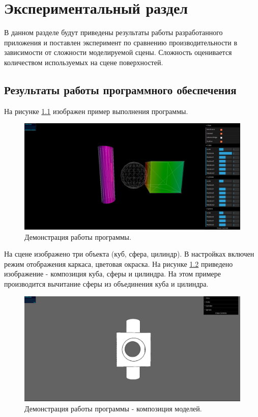 \chapter{Экспериментальный раздел}
\label{cha:research}

В данном разделе будут приведены результаты работы разработанного
приложения и поставлен эксперимент по сравнению производительности
в зависимости от сложности моделируемой сцены. Сложность оценивается количеством используемых на сцене поверхностей.

\section{Результаты работы программного обеспечения}
На рисунке \ref{fig:example_run} изображен пример выполнения программы. 
\begin{figure}
  \centering
  \includegraphics[scale=0.4]{inc/img/example_run}
  \caption{Демонстрация работы программы.}
  \label{fig:example_run}
\end{figure}

На сцене изображено три объекта (куб, сфера, цилиндр).
В настройках включен режим отображения каркаса, цветовая окраска.
\newpage
На рисунке \ref{fig:example_run_base} приведено изображение - композиция куба, 
сферы и цилиндра. 
На этом примере производится вычитание сферы из объединения куба и цилиндра.
\begin{figure}
  \centering
  \includegraphics[scale=0.4]{inc/img/example_run_base}
  \caption{Демонстрация работы программы - композиция моделей.}
  \label{fig:example_run_base}
\end{figure}

